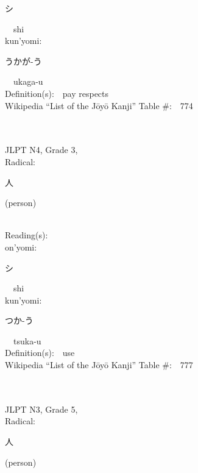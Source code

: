 \begin{multicols}{2}
{\hspace*{2em}}{\begin{CJK}{UTF8}{min} シ \end{CJK}}\ \ shi\ \ \\
{\hspace*{1em}}kun'yomi:\ \ \\
{\hspace*{2em}}{\begin{CJK}{UTF8}{min} うかが-う \end{CJK}}\ \ ukaga-u\ \ \\
Definition(s):\ \ pay respects \\
Wikipedia ``List of the J\=oy\=o Kanji'' Table \#:\ \ 774 \\
\ \ \\
{\fontsize{34pt}{40pt}  }\ \ \\  %
{JLPT N4, Grade 3, \\Radical:\ \ {\begin{CJK}{UTF8}{min} 人 \end{CJK}} (person) } \\
Reading(s):\ \ \\
{\hspace*{1em}}on'yomi:\ \ \\
{\hspace*{2em}}{\begin{CJK}{UTF8}{min} シ \end{CJK}}\ \ shi\ \ \\
{\hspace*{1em}}kun'yomi:\ \ \\
{\hspace*{2em}}{\begin{CJK}{UTF8}{min} つか-う \end{CJK}}\ \ tsuka-u\ \ \\
Definition(s):\ \ use \\
Wikipedia ``List of the J\=oy\=o Kanji'' Table \#:\ \ 777 \\
\ \ \\
{\fontsize{34pt}{40pt}  }\ \ \\  %
{JLPT N3, Grade 5, \\Radical:\ \ {\begin{CJK}{UTF8}{min} 人 \end{CJK}} (person) } \\

\end{multicols}
